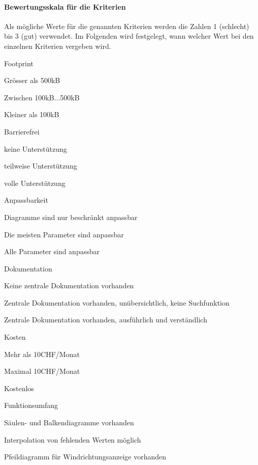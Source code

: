 \paragraph*{Bewertungsskala für die Kriterien}
Als mögliche Werte für die genannten Kriterien werden die Zahlen 1 (schlecht) bis 3 (gut) verwendet. Im Folgenden wird festgelegt, wann welcher Wert bei den einzelnen Kriterien vergeben wird.
\begin{itemize*}
\item Footprint
  \begin{enumerate*}
  \item Grösser als 500kB
  \item Zwischen 100kB...500kB
  \item Kleiner als 100kB
  \end{enumerate*}
\item Barrierefrei
  \begin{enumerate*}
  \item keine Unterstützung
  \item teilweise Unterstützung
  \item volle Unterstützung
  \end{enumerate*}
\item Anpassbarkeit
  \begin{enumerate*}
  \item Diagramme sind nur beschränkt anpassbar
  \item Die meisten Parameter sind anpassbar
  \item Alle Parameter sind anpassbar
  \end{enumerate*}
\item Dokumentation
  \begin{enumerate*}
  \item Keine zentrale Dokumentation vorhanden
  \item Zentrale Dokumentation vorhanden, unübersichtlich, keine Suchfunktion
  \item Zentrale Dokumentation vorhanden, ausführlich und verständlich
  \end{enumerate*}
\item Kosten
  \begin{enumerate*}
  \item Mehr als 10CHF/Monat
  \item Maximal 10CHF/Monat
  \item Kostenlos
  \end{enumerate*}
\item Funktionsumfang
  \begin{enumerate*}
  \item Säulen- und Balkendiagramme vorhanden
  \item Interpolation von fehlenden Werten möglich
  \item Pfeildiagramm für Windrichtungsanzeige vorhanden
  \end{enumerate*}
\end{itemize*}


